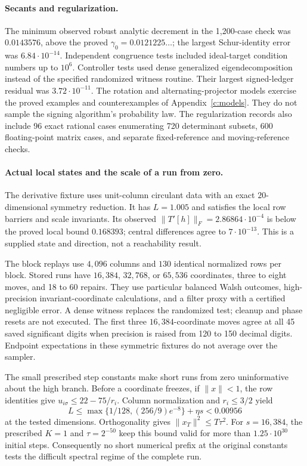 \documentclass[11pt]{amsart}
\theoremstyle{definition}\newtheorem{definition}[theorem]{Definition}
\theoremstyle{remark}\newtheorem{remark}[theorem]{Remark}
\numberwithin{equation}{section}
\begin{document}
\paragraph{Secants and regularization.}
The minimum observed robust analytic decrement in the 1,200-case check
was $0.0143576$, above the proved $\gamma_0=0.0121225\ldots$; the largest
Schur-identity error was $6.84\cdot10^{-14}$. Independent congruence tests
included ideal-target condition numbers up to $10^6$.
Controller tests used dense generalized eigendecomposition instead of the
specified randomized witness routine. Their largest signed-ledger residual
was $3.72\cdot10^{-11}$. The rotation and alternating-projector models
exercise the proved examples and counterexamples of Appendix~\ref{c:models}.
They do not sample the signing algorithm's probability law.
The regularization records also include 96 exact rational cases enumerating
720 determinant subsets, 600 floating-point matrix cases, and separate
fixed-reference and moving-reference checks.

\paragraph{Actual local states and the scale of a run from zero.}
The derivative fixture uses unit-column circulant data with an exact
$20$-dimensional symmetry reduction. It has $L=1.005$ and satisfies the
local row barriers and scale invariants. Its observed
$\|T'[h]\|_F=2.86864\cdot10^{-4}$ is below the proved local bound
$0.168393$; central differences agree to $7\cdot10^{-13}$.
This is a supplied state and direction, not a reachability result.

The block replays use $4,096$ columns and $130$ identical normalized rows
per block. Stored runs have $16,384$, $32,768$, or $65,536$ coordinates,
three to eight moves, and 18 to 60 repairs. They use particular balanced
Walsh outcomes, high-precision invariant-coordinate calculations, and a
filter proxy with a certified negligible error. A dense witness replaces
the randomized test; cleanup and phase resets are not executed. The first
three $16,384$-coordinate moves agree at all 45 saved significant digits
when precision is raised from 120 to 150 decimal digits. Endpoint
expectations in these symmetric fixtures do not average over the sampler.

The small prescribed step constants make short runs from zero uninformative
about the high branch. Before a coordinate freezes, if $\|x\|<1$, the row
identities give $u_{i\sigma}\le22-75/r_i$. Column normalization and
$r_i\le3/2$ yield
\[
 L\le\max\{1/128,(256/9)e^{-8}\}+\eta s<0.00956
\]
at the tested dimensions. Orthogonality gives $\|x_T\|^2\le T\tau^2$.
For $s=16,384$, the prescribed $K=1$ and $\tau=2^{-50}$ keep this bound
valid for more than $1.25\cdot10^{30}$ initial steps. Consequently no
short numerical prefix at the original constants tests the difficult
spectral regime of the complete run.
\end{document}
